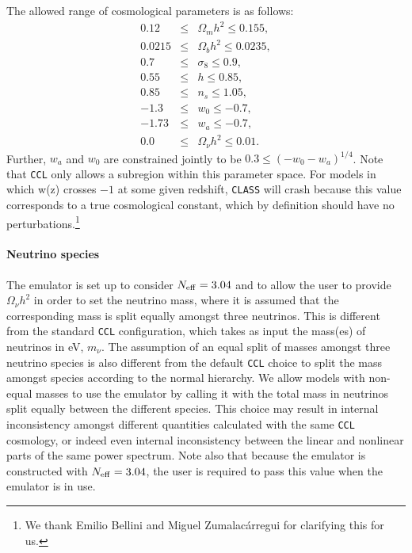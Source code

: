 \documentclass[\docopts]{\docclass}
\newcommand{\ccl}{{\tt CCL}\xspace}
\begin{document}
The allowed range of cosmological parameters is as follows:
\begin{eqnarray}
0.12&\leq& \Omega_m h^2 \leq 0.155,\nonumber\\
0.0215&\leq& \Omega_b h^2 \leq 0.0235,\nonumber\\
0.7&\leq& \sigma_8 \leq 0.9,\nonumber\\
0.55&\leq& h \leq 0.85,\nonumber\\
0.85&\leq& n_s\leq 1.05,\nonumber\\
-1.3&\leq& w_0\leq-0.7,\nonumber\\
-1.73&\leq& w_a\leq -0.7,\nonumber\\
0.0&\leq& \Omega_\nu h^2 \leq 0.01.
\end{eqnarray}
Further, $w_a$ and $w_0$ are constrained jointly to be $0.3\leq (-w_0-w_a)^{1/4}$.
Note that \ccl only allows a subregion within this parameter space. For models in which w(z) crosses $-1$ at some
given redshift, {\tt CLASS} will crash because this value corresponds
to a true cosmological constant, which by definition should have no
perturbations.\footnote{
  We thank Emilio Bellini and Miguel Zumalac\'arregui for clarifying this for us.}

\paragraph{Neutrino species} The emulator is set up to consider $N_{\rm eff}=3.04$
and to allow the user to provide $\Omega_\nu h^2$ in order to set the
neutrino mass, where it is assumed that the corresponding mass is split equally
amongst three neutrinos. This is different from the standard {\tt CCL}
configuration, which takes as input the mass(es) of neutrinos in eV, $m_{\nu}$.
The assumption of an equal split of masses amongst three neutrino species is
also different from the default \ccl choice to split the mass amongst species
according to the normal hierarchy. We allow models with non-equal masses to use
the emulator by calling it with the total mass in neutrinos split equally between
the different species. This choice may result in internal inconsistency amongst
different quantities calculated with the same \ccl cosmology, or indeed even
internal inconsistency between the linear and nonlinear parts of the same
power spectrum. Note also that because the emulator is constructed with
$N_{\rm eff}=3.04$, the user is required to pass this value when the emulator
is in use.
\end{document}
